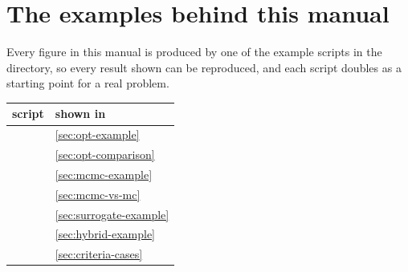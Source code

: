 \section{The examples behind this manual}

Every figure in this manual is produced by one of the example scripts in the 
directory, so every result shown can be reproduced, and each script doubles as a starting point for
a real problem.

\begin{center}
\small
\begin{tabularx}{\linewidth}{@{}l L@{}}
  \toprule
  \textbf{script} & \textbf{shown in} \\
  \midrule
                     & \cref{sec:opt-example} \\
   & \cref{sec:opt-comparison} \\
                             & \cref{sec:mcmc-example} \\
           & \cref{sec:mcmc-vs-mc} \\
                   & \cref{sec:surrogate-example} \\
                      & \cref{sec:hybrid-example} \\
            & \cref{sec:criteria-cases} \\
  \bottomrule
\end{tabularx}
\end{center}
